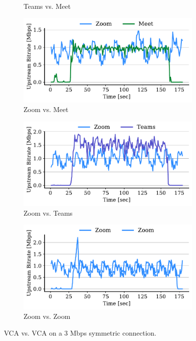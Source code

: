 \begin{figure}[]
\begin{subfigure}[t]{.4\textwidth}
    \caption{Teams vs. Meet}
    \label{subfig:teams-meet-3}
\end{subfigure}
\begin{subfigure}[t]{.4\textwidth}
    \centering
    \includegraphics[width=1\textwidth]{figures/appendix/zoom_meet_3_ul_r2.pdf}
    \caption{Zoom vs. Meet}
    \label{subfig:zoom-meet-3}
\end{subfigure}
\begin{subfigure}[t]{.4\textwidth}
    \centering
    \includegraphics[width=1\textwidth]{figures/appendix/zoom_teams_3_ul_r2.pdf}
    \caption{Zoom vs. Teams}
    \label{subfig:zoom-teams-3}
\end{subfigure}
\begin{subfigure}[t]{.4\textwidth}
    \centering
    \includegraphics[width=1\textwidth]{figures/appendix/zoom_zoom_3_ul_r1.pdf}
    \caption{Zoom vs. Zoom}
    \label{subfig:zoom-zoom-3}
\end{subfigure}
\caption{VCA vs. VCA on a 3 Mbps symmetric connection.}
\label{fig:vca-vca-3}
\end{figure}